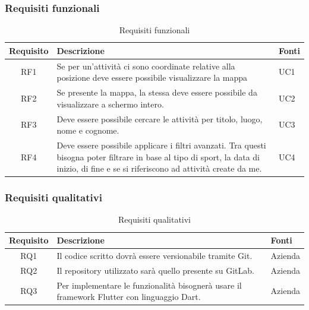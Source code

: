 \subsubsection{Requisiti funzionali}

\begin{center}
	\begin{table}[h!]
		
		\label{tab:Requisiti funzionali}
		\begin{tabularx}{\textwidth}{|c|p{8cm}|p{2.1cm}|}
			
			\hline
			\textbf{Requisito} & \centering\textbf{Descrizione} & \textbf{Fonti}  \\\hline
			
			RF1 & Se per un'attività ci sono coordinate relative alla posizione deve essere possibile visualizzare la mappa  & UC1\\
			\hline	
			RF2 &Se presente la mappa, la stessa deve essere possibile da visualizzare a schermo intero. & UC2\\
			\hline
			RF3& Deve essere possibile cercare le attività per titolo, luogo, nome e cognome.	& UC3	\\
			\hline	
			RF4& Deve essere possibile applicare i filtri avanzati. Tra questi bisogna poter filtrare in base al tipo di sport, la data di inizio, di fine e se si riferiscono ad attività create da me.	& UC4	\\
			\hline		
		\end{tabularx}
		\vspace{0.3cm}
		\caption{Requisiti funzionali}
	\end{table}
\end{center}

\newpage

\subsubsection{Requisiti qualitativi}

\begin{center}
	\begin{table}[h!]
		
		\label{tab:Requisiti qualitativi}
		\begin{tabularx}{\textwidth}{|c|p{8cm}|p{2.1cm}|}
			
			\hline
			\textbf{Requisito} & \centering\textbf{Descrizione} & \textbf{Fonti}  \\\hline
			
			RQ1 &Il codice scritto dovrà essere versionabile tramite Git.  & Azienda\\
			\hline	
			RQ2 &Il repository utilizzato sarà quello presente su GitLab. & Azienda\\
			\hline
			RQ3& Per implementare le funzionalità bisognerà usare il framework Flutter con linguaggio Dart.	& Azienda	\\
			\hline		
		\end{tabularx}
		\vspace{0.3cm}
		\caption{Requisiti qualitativi}
	\end{table}
\end{center}

